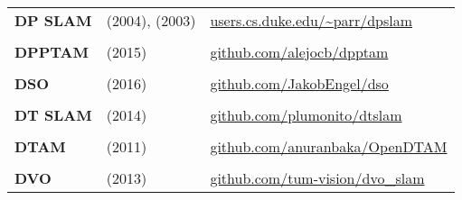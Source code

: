 \documentclass[a4paper,12pt]{scrartcl}
\begin{document}
{\begin{longtable}{l|l|l}
    \textbf{DP SLAM}       & \cite{Eliazar2004} (2004), \cite{Eliazar2003} (2003)                                        & {\url{users.cs.duke.edu/~parr/dpslam}}                                \\
                           &                                                                                             &                                                                       \\ [-3mm]
    \textbf{DPPTAM}        & \cite{Concha2015b} (2015)                                                                   & {\url{github.com/alejocb/dpptam}}                                     \\
                           &                                                                                             &                                                                       \\ [-3mm]
    \textbf{DSO}           & \cite{Engel2016} (2016)                                                                     & {\url{github.com/JakobEngel/dso}}                                     \\
                           &                                                                                             &                                                                       \\ [-3mm]
    \textbf{DT SLAM}       & \cite{Daniel2014} (2014)                                                                    & {\url{github.com/plumonito/dtslam}}                                   \\
                           &                                                                                             &                                                                       \\ [-3mm]
    \textbf{DTAM}          & \cite{Newcombe2011} (2011)                                                                  & {\url{github.com/anuranbaka/OpenDTAM}}                                \\
                           &                                                                                             &                                                                       \\ [-3mm]
    \textbf{DVO}           & \cite{Kerl2013} (2013)                                                                      & {\url{github.com/tum-vision/dvo_slam}}                                \\

\end{longtable}}
\end{document}
